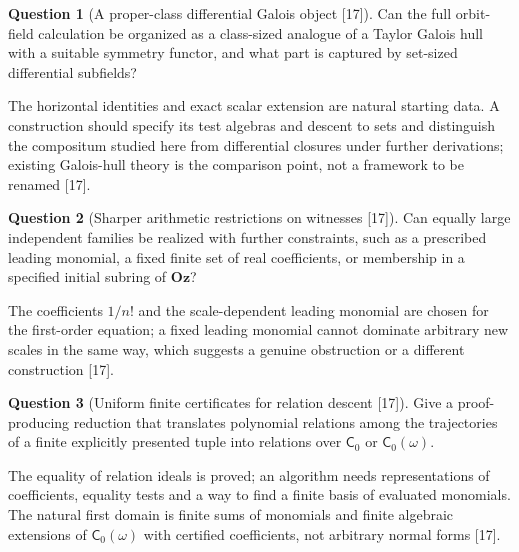 \documentclass[11pt,oneside]{article}
\numberwithin{equation}{section}
\theoremstyle{definition}
\newtheorem{question}[question]{Question}
\theoremstyle{remark}
\newcommand{\Oz}{\mathbf{Oz}}
\newcommand{\src}[1]{\textup{\textsf{\small[#1]}}}
\begin{document}
\begin{question}[A proper-class differential Galois object \src{17}]\label{opa:of:q:galois}
Can the full orbit-field calculation be organized as a class-sized analogue of a Taylor Galois hull with a suitable symmetry
functor, and what part is captured by set-sized differential subfields?
\end{question}
The horizontal identities and exact scalar extension are natural starting data. A construction should specify its test algebras
and descent to sets and distinguish the compositum studied here from differential closures under further derivations; existing
Galois-hull theory \cite{Heiderich} is the comparison point, not a framework to be renamed \src{17}.

\begin{question}[Sharper arithmetic restrictions on witnesses \src{17}]\label{opa:of:q:witnesses}
Can equally large independent families be realized with further constraints, such as a prescribed leading monomial, a fixed finite
set of real coefficients, or membership in a specified initial subring of $\Oz$?
\end{question}
The coefficients $1/n!$ and the scale-dependent leading monomial are chosen for the first-order equation; a fixed leading monomial
cannot dominate arbitrary new scales in the same way, which suggests a genuine obstruction or a different construction \src{17}.

\begin{question}[Uniform finite certificates for relation descent \src{17}]\label{opa:of:q:certificates}
Give a proof-producing reduction that translates polynomial relations among the trajectories of a finite explicitly presented tuple
into relations over $\mathsf C_0$ or $\mathsf C_0(\omega)$.
\end{question}
The equality of relation ideals is proved; an algorithm needs representations of coefficients, equality tests and a way to find a
finite basis of evaluated monomials. The natural first domain is finite sums of monomials and finite algebraic extensions of
$\mathsf C_0(\omega)$ with certified coefficients, not arbitrary normal forms \src{17}.
\end{document}

